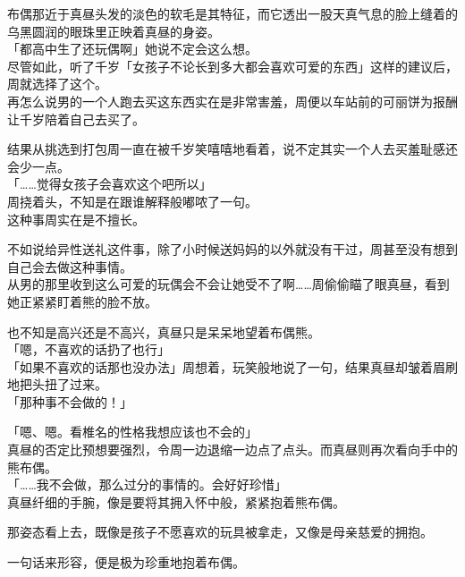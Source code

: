 布偶那近于真昼头发的淡色的软毛是其特征，而它透出一股天真气息的脸上缝着的乌黑圆润的眼珠里正映着真昼的身姿。\\

「都高中生了还玩偶啊」她说不定会这么想。\\

尽管如此，听了千岁「女孩子不论长到多大都会喜欢可爱的东西」这样的建议后，周就选择了这个。\\

再怎么说男的一个人跑去买这东西实在是非常害羞，周便以车站前的可丽饼为报酬让千岁陪着自己去买了。

结果从挑选到打包周一直在被千岁笑嘻嘻地看着，说不定其实一个人去买羞耻感还会少一点。\\

「……觉得女孩子会喜欢这个吧所以」\\

周挠着头，不知是在跟谁解释般嘟哝了一句。\\

这种事周实在是不擅长。

不如说给异性送礼这件事，除了小时候送妈妈的以外就没有干过，周甚至没有想到自己会去做这种事情。\\

从男的那里收到这么可爱的玩偶会不会让她受不了啊……周偷偷瞄了眼真昼，看到她正紧紧盯着熊的脸不放。

也不知是高兴还是不高兴，真昼只是呆呆地望着布偶熊。\\

「嗯，不喜欢的话扔了也行」\\

「如果不喜欢的话那也没办法」周想着，玩笑般地说了一句，结果真昼却皱着眉刷地把头扭了过来。\\

「那种事不会做的！」

「嗯、嗯。看椎名的性格我想应该也不会的」\\

真昼的否定比预想要强烈，令周一边退缩一边点了点头。而真昼则再次看向手中的熊布偶。\\

「……我不会做，那么过分的事情的。会好好珍惜」\\

真昼纤细的手腕，像是要将其拥入怀中般，紧紧抱着熊布偶。

那姿态看上去，既像是孩子不愿喜欢的玩具被拿走，又像是母亲慈爱的拥抱。

一句话来形容，便是极为珍重地抱着布偶。\\

